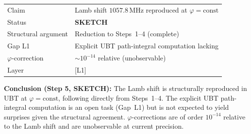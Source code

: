 \documentclass[12pt]{article}
\theoremstyle{definition}
\theoremstyle{remark}
\begin{document}
\begin{center}
\begin{tabular}{ll}
\hline
Claim & Lamb shift $1057.8\,\mathrm{MHz}$ reproduced at $\varphi = \mathrm{const}$ \\
Status & \textbf{SKETCH} \\
Structural argument & Reduction to Steps~1--4 (complete) \\
Gap L1 & Explicit UBT path-integral computation lacking \\
$\varphi$-correction & $\sim 10^{-14}$ relative (unobservable) \\
Layer & [L1] \\
\hline
\end{tabular}
\end{center}

\begin{resultbox}
\textbf{Conclusion (Step 5, SKETCH):}
The Lamb shift is structurally reproduced in UBT at $\varphi = \mathrm{const}$, following
directly from Steps~1--4.  The explicit UBT path-integral computation is an open task
(Gap~L1) but is not expected to yield surprises given the structural agreement.
$\varphi$-corrections are of order $10^{-14}$ relative to the Lamb shift and are
unobservable at current precision.
\end{resultbox}

\ifdefined\INCLUDEMODE\else
  
\end{document}
